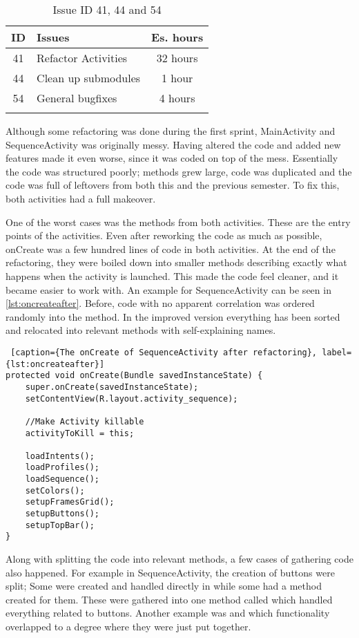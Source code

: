 \begin{longtable} { | c | p{12cm} | c | } 
\hline
	ID 	&	Issues	&		 Es. hours \\\hline
	41	&	Refactor Activities	&	32 hours	\\\hline
	44	&	Clean up submodules &	1 hour	\\\hline
	54	&	General bugfixes	&	4 hours \\\hline
\caption{Issue ID 41, 44 and 54}
\label{tab:spr4_refactoroverview}
\end{longtable}

Although some refactoring was done during the first sprint, MainActivity and SequenceActivity was originally messy. Having altered the code and added new features made it even worse, since it was coded on top of the mess. Essentially the code was structured poorly; methods grew large, code was duplicated and the code was full of leftovers from both this and the previous semester. To fix this, both activities had a full makeover.

One of the worst cases was the  methods from both activities. These are the entry points of the activities. Even after reworking the code as much as possible, onCreate was a few hundred lines of code in both activities. At the end of the refactoring, they were boiled down into smaller methods describing exactly what happens when the activity is launched. This made the code feel cleaner, and it became easier to work with. An example for SequenceActivity can be seen in \ref{lst:oncreateafter}. Before, code with no apparent correlation was ordered randomly into the  method. In the improved version everything has been sorted and relocated into relevant methods with self-explaining names.

\begin{lstlisting} [caption={The onCreate of SequenceActivity after refactoring}, label={lst:oncreateafter}]
protected void onCreate(Bundle savedInstanceState) {
    super.onCreate(savedInstanceState);
    setContentView(R.layout.activity_sequence);
	
    //Make Activity killable
    activityToKill = this;

    loadIntents();
    loadProfiles();
    loadSequence();
    setColors();
    setupFramesGrid();
    setupButtons();
    setupTopBar();
}
\end{lstlisting}

Along with splitting the code into relevant methods, a few cases of gathering code also happened. For example in SequenceActivity, the creation of buttons were split; Some were created and handled directly in  while some had a method created for them. These were gathered into one method called  which handled everything related to buttons. Another example was  and  which functionality overlapped to a degree where they were just put together.

